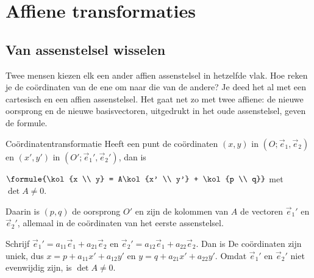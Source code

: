 \section{Affiene transformaties}

\subsection{Van assenstelsel wisselen}

Twee mensen kiezen elk een ander affien assenstelsel in hetzelfde vlak. Hoe reken je de coördinaten van de ene om naar die van de andere? Je deed het al met een cartesisch en een affien assenstelsel. Het gaat net zo met twee affiene: de nieuwe oorsprong en de nieuwe basisvectoren, uitgedrukt in het oude assenstelsel, geven de formule.

\begin{theorie}
\begin{stelling}{Coördinatentransformatie}
Heeft een punt de coördinaten $(x, y)$ in $(O; \vec e_1, \vec e_2)$ en $(x', y')$ in $(O'; \vec e_1\!', \vec e_2\!')$, dan is

\vspace{1mm}
\qquad $\formule{\kol{x \\ y} = A\kol{x' \\ y'} + \kol{p \\ q}}$ \qquad met $\det A \neq 0$.

\vspace{1mm}
Daarin is $(p, q)$ de oorsprong $O'$ en zijn de kolommen van $A$ de vectoren $\vec e_1\!'$ en $\vec e_2\!'$, allemaal in de coördinaten van het eerste assenstelsel.
\end{stelling}

\begin{bewijs}
Schrijf $\vec e_1\!' = a_{11}\vec e_1 + a_{21}\vec e_2$ en $\vec e_2\!' = a_{12}\vec e_1 + a_{22}\vec e_2$. Dan is
De coördinaten zijn uniek, dus $x = p + a_{11}x' + a_{12}y'$ en $y = q + a_{21}x' + a_{22}y'$. Omdat $\vec e_1\!'$ en $\vec e_2\!'$ niet evenwijdig zijn, is $\det A \neq 0$.
\end{bewijs}
\end{theorie}


